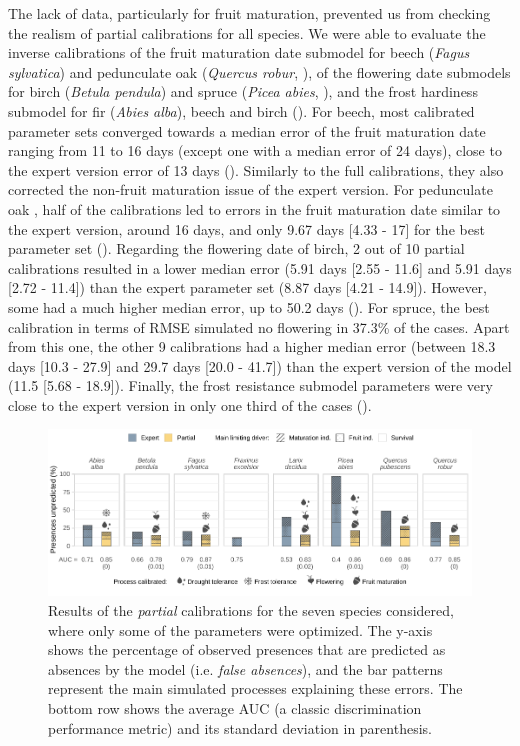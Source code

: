 The lack of data, particularly for fruit maturation, prevented us from checking the realism of partial calibrations for all species. We were able to evaluate the inverse calibrations of the fruit maturation date submodel for beech (\emph{Fagus sylvatica}) and pedunculate oak (\emph{Quercus robur}, ), of the flowering date submodels for birch (\emph{Betula pendula}) and spruce  (\emph{Picea abies}, ), and the frost hardiness submodel for fir (\emph{Abies alba}), beech and birch (). For beech, most calibrated parameter sets converged towards a median error of the fruit maturation date ranging from 11 to 16 days (except one with a median error of 24 days), close to the expert version error of 13 days (). Similarly to the full calibrations, they also corrected the non-fruit maturation issue of the expert version. For pedunculate oak , half of the calibrations led to errors in the fruit maturation date similar to the expert version, around 16 days, and only 9.67 days [4.33 - 17] for the best parameter set (). Regarding the flowering date of birch, 2 out of 10 partial calibrations resulted in a lower median error (5.91 days [2.55 - 11.6] and 5.91 days [2.72 - 11.4]) than the expert parameter set (8.87 days [4.21 - 14.9]). However, some had a much higher median error, up to 50.2 days (). For spruce, the best calibration in terms of RMSE simulated no flowering in 37.3\% of the cases. Apart from this one, the other 9 calibrations had a higher median error (between 18.3 days [10.3 - 27.9] and 29.7 days [20.0 - 41.7]) than the expert version of the model (11.5 [5.68 - 18.9]). Finally, the frost resistance submodel parameters were very close to the expert version in only one third of the cases ().

\begin{figure}[htpb]
\hspace*{-0.5cm}
\centering
\includegraphics[width=30cm]{chapter3/figs/fig6-1 - icons.pdf}
\caption{Results of the \emph{partial} calibrations for the seven species considered, where only some of the parameters were optimized. The y-axis shows the percentage of observed presences that are predicted as absences by the model (i.e. \emph{false absences}), and the bar patterns represent the main simulated processes explaining these errors. The bottom row shows the average AUC (a classic discrimination performance metric) and its standard deviation in parenthesis.}
\label{fig:4}
\end{figure}

